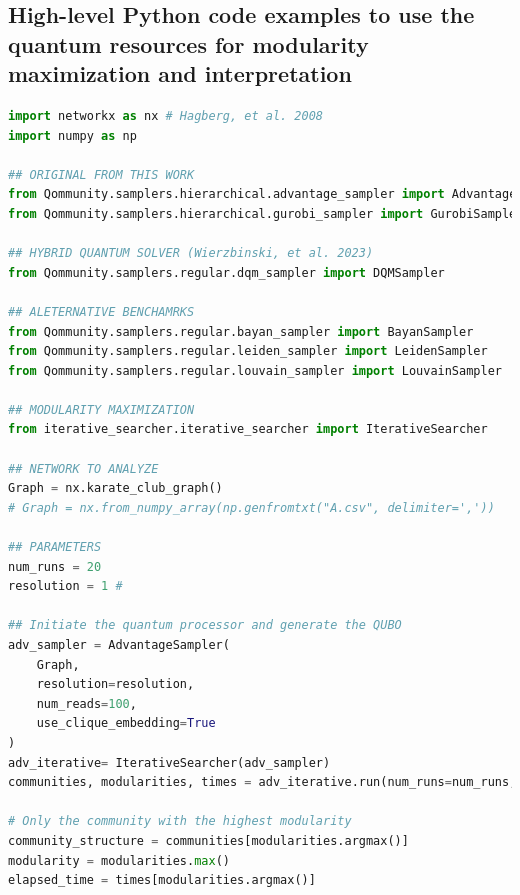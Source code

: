 \documentclass[pdflatex,sn-mathphys-num]{sn-jnl}%
\begin{document}
\subsection*{High-level Python code examples to use the quantum resources for modularity maximization and interpretation}
\begin{lstlisting}[language=Python, caption=Modularity maximization and community detection using \textit{Qommunity}. After importing the relevant Python modules maximizing the modularity of the network using quantum computing would be trivial., label=python1]
import networkx as nx # Hagberg, et al. 2008
import numpy as np

## ORIGINAL FROM THIS WORK
from Qommunity.samplers.hierarchical.advantage_sampler import AdvantageSampler # H. Annealing
from Qommunity.samplers.hierarchical.gurobi_sampler import GurobiSampler # H. Gurobi

## HYBRID QUANTUM SOLVER (Wierzbinski, et al. 2023)
from Qommunity.samplers.regular.dqm_sampler import DQMSampler 

## ALETERNATIVE BENCHAMRKS
from Qommunity.samplers.regular.bayan_sampler import BayanSampler 
from Qommunity.samplers.regular.leiden_sampler import LeidenSampler
from Qommunity.samplers.regular.louvain_sampler import LouvainSampler

## MODULARITY MAXIMIZATION
from iterative_searcher.iterative_searcher import IterativeSearcher

## NETWORK TO ANALYZE
Graph = nx.karate_club_graph()
# Graph = nx.from_numpy_array(np.genfromtxt("A.csv", delimiter=','))

## PARAMETERS
num_runs = 20
resolution = 1 #

## Initiate the quantum processor and generate the QUBO
adv_sampler = AdvantageSampler(
    Graph, 
    resolution=resolution, 
    num_reads=100, 
    use_clique_embedding=True
)
adv_iterative= IterativeSearcher(adv_sampler)
communities, modularities, times = adv_iterative.run(num_runs=num_runs, save_results=False)

# Only the community with the highest modularity
community_structure = communities[modularities.argmax()]
modularity = modularities.max()
elapsed_time = times[modularities.argmax()]

\end{lstlisting}
\end{document}
